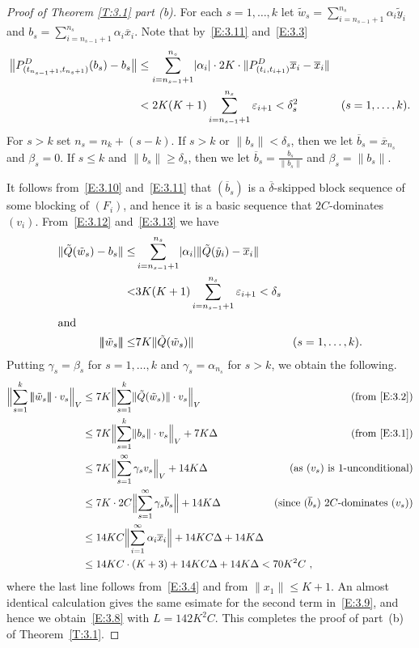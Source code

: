 \documentclass[11pt,leqno]{amsart}
\theoremstyle{definition}
\def\trivert#1{|\!|\!| #1|\!|\!|}
\newcommand{\vp}{\varepsilon}
\newcommand{\bb}{\overline{b}}
\newcommand{\xb}{\overline{x}}
\newcommand{\norm}[1]{\lVert#1\rVert}
\newcommand{\abs}[1]{\lvert#1\rvert}
\newcommand{\bignorm}[1]{\bigl\lVert#1\bigr\rVert}
\newcommand{\Bignorm}[1]{\Bigl\lVert#1\Bigr\rVert}
\newcommand{\deltab}{\overline\delta}
\newcommand{\yt}{\tilde y}
\newcommand{\wt}{\tilde w}
\newcommand{\Qt}{\tilde Q}
\begin{document}
\begin{proof}[Proof of Theorem \ref{T:3.1} part (b)]
  For each $s=1,\dots,k$ let $\wt_s=\sum_{i=n_{s-1}+1}^{n_s}
  \alpha_i\yt_i$ and $b_s=\sum_{i=n_{s-1}+1}^{n_s}
  \alpha_i\xb_i$. Note that by~\eqref{E:3.11} and~\eqref{E:3.3}
  \begin{align}
    \label{E:3.10}
    \bignorm{P^D_{(t_{n_{s-1}+1},t_{n_s+1})}(b_s)-b_s} &\leq
    \sum_{i=n_{s-1}+1}^{n_s} \abs{\alpha_i}\cdot 2K\cdot
    \norm{P^D_{(t_i,t_{i+1})} \xb_i - \xb_i}\\
    &<2K(K+1)\sum_{i=n_{s-1}+1}^{n_s} \vp_{i+1}<\delta_s^2 &
    \text{($s=1,\dots,k$).}\notag
  \end{align}
  For $s>k$ set $n_s=n_k+(s-k)$. If $s>k$ or $\norm{b_s}<\delta_s$,
  then we let $\bb_s=\xb_{n_s}$ and $\beta_s=0$. If $s\leq k$ and
  $\norm{b_s}\geq\delta_s$, then we let $\bb_s=\frac{b_s}{\norm{b_s}}$
  and $\beta_s=\norm{b_s}$.

  It follows from~\eqref{E:3.10} and~\eqref{E:3.11} that $(\bb_s)$ is
  a $\deltab$-skipped block sequence of some blocking of $(F_i)$, and
  hence it is a basic sequence that $2C$-dominates
  $(v_i)$. From~\eqref{E:3.12} and~\eqref{E:3.13} we have
  \begin{align}
    \label{E:3.1}
    \norm{\Qt(\wt_s)-b_s} \leq& \sum_{i=n_{s-1}+1}^{n_s}
    \abs{\alpha_i}\norm{\Qt(\yt_i)-\xb_i}\\
    <&3K(K+1)\sum_{i=n_{s-1}+1}^{n_s}\vp_{i+1}
    <\delta_s\notag\\
    \intertext{and}
    \label{E:3.2}
    \trivert{\wt_s}\leq& 7K\norm{\Qt(\wt_s)} &\text{($s=1,\dots,k$).}
  \end{align}
  Putting $\gamma_s=\beta_s$ for $s=1,\dots,k$ and
  $\gamma_s=\alpha_{n_s}$ for $s>k$, we obtain the following.
  \begin{align*}
    \Bignorm{\sum _{s=1}^k \trivert{\wt_s}\cdot v_s}_V &\leq 7K
    \Bignorm{\sum _{s=1}^k \norm{\Qt(\wt_s)}\cdot v_s}_V
    &\text{(from~\eqref{E:3.2})}\\
    & \leq 7K \Bignorm{\sum _{s=1}^k \norm{b_s}\cdot
      v_s}_V+7K\Delta &\text{(from~\eqref{E:3.1})}\\
    &\leq 7K\Bignorm{\sum_{s=1}^{\infty} \gamma_sv_s}_V+14K\Delta
    &\text{(as $(v_s)$ is $1$-unconditional)}\\
    &\leq 7K\cdot2C\Bignorm{\sum_{s=1}^{\infty} \gamma_s\bb_s}
    +14K\Delta &\text{(since $(\bb_s)$ $2C$-dominates $(v_s)$)}\\
    &\leq 14KC\Bignorm{\sum_{i=1}^{\infty} \alpha_i\xb_i}+14KC\Delta
    +14K\Delta\\
    &\leq\text{\makebox[0pt][l]{$14KC\cdot (K+3)+14KC\Delta
      +14K\Delta<70K^2C\ ,$}}
  \end{align*}
  where the last line follows from~\eqref{E:3.4} and from
  $\norm{x_1}\leq K+1$. An almost identical calculation gives the same
  esimate for the second term in~\eqref{E:3.9}, and hence we
  obtain~\eqref{E:3.8} with $L=142K^2C$. This completes the proof of
  part~(b) of Theorem~\ref{T:3.1}.
\end{proof}
\end{document}
